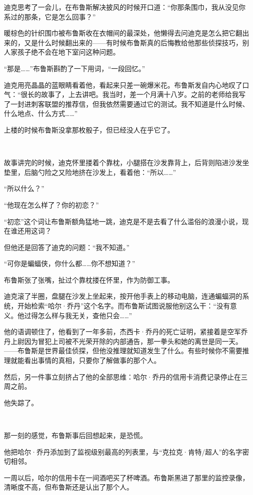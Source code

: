 \documentclass[../main]{subfiles}
\begin{document}
迪克思考了一会儿，在布鲁斯解决披风的时候开口道：“你那条围巾，我从没见你系过的那条，它是怎么回事？”

暖棕色的针织围巾被布鲁斯收在衣帽间的最深处，他懒得去问迪克是怎么把它翻出来的，又是什么时候翻出来的——有时候布鲁斯真的后悔教给他那些侦探技巧，别人家孩子绝不会在地下室问这种问题。

“那是……”布鲁斯斟酌了一下用词，“一段回忆。”

迪克用亮晶晶的蓝眼睛看着他，看起来只差一碗爆米花。布鲁斯发自内心地叹了口气：“很长的故事了，上去讲吧。我当时，差一个月满十八岁。之前的老师给我写了一封进刺客联盟的推荐信，但我依然需要通过它的测试。我不知道是什么时候、什么地点、什么方式……”

上楼的时候布鲁斯没拿那枚骰子，但已经没人在乎它了。

~\

故事讲完的时候，迪克怀里搂着个靠枕，小腿搭在沙发靠背上，后背则陷进沙发坐垫里，后脑勺险之又险地挤在沙发上，看着他：“所以……”

“所以什么？”

“他现在怎么样了？你的初恋？”

“初恋”这个词让布鲁斯额角猛地一跳，迪克是不是去看了什么滥俗的浪漫小说，现在谁还用这词？

但他还是回答了迪克的问题：“我不知道。”

“可你是蝙蝠侠，你什么都……你不想知道？”

布鲁斯张了张嘴，扯过个靠枕搂在怀里，作为防御工事。

迪克滚了半圈，盘腿在沙发上坐起来，按开他手表上的移动电脑，连通蝙蝠洞的系统，开始检索“哈尔·乔丹”这个名字。而布鲁斯试图说服他别这么干：“没有意义。他过得怎么样与我无关，查他只会……”

他的语调顿住了，他看到了一年多前，杰西卡·乔丹的死亡证明，紧接着是空军乔丹上尉因为冒犯上司被不光荣开除的内部通告，那一拳头和她的离世是同一天。——布鲁斯是世界最佳侦探，但他没推理就知道发生了什么。有些时候你不需要推理就能看出事情的真相，只要你了解做事的那个人。

然后，另一件事立刻挤占了他的全部思维：哈尔·乔丹的信用卡消费记录停止在三周之前。

他失踪了。

~\

那一刻的感觉，布鲁斯事后回想起来，是恐慌。

他把哈尔·乔丹添加到了监视级别最高的列表里，与“克拉克·肯特/超人”的名字密切相邻。

一周以后，哈尔的信用卡在一间酒吧买了杯啤酒。布鲁斯黑进了那里的监控录像，清晰度不高，但布鲁斯还是认出了那个人。
\end{document}
